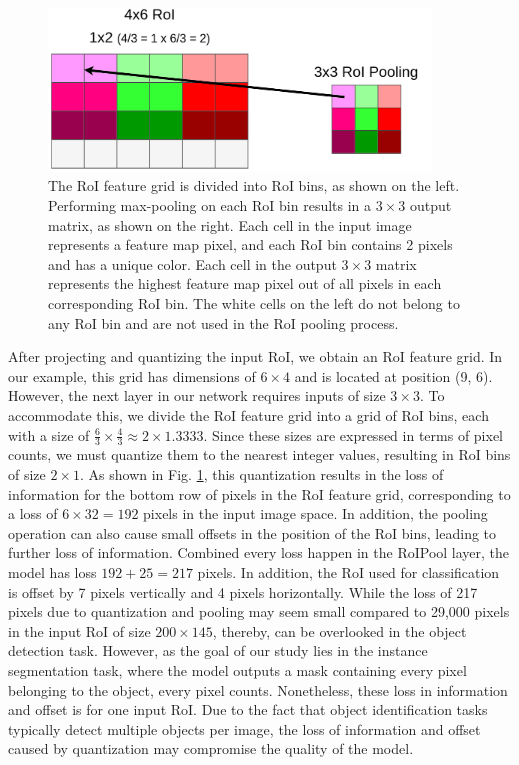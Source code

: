 \begin{figure}[!ht]
    \centering
    \includegraphics[width=4in]{figures/roi_pool_ex.png}
    \caption{The RoI feature grid is divided into RoI bins, as shown on the left. Performing max-pooling on each RoI bin results in a $3 \times 3$ output matrix, as shown on the right. Each cell in the input image represents a feature map pixel, and each RoI bin contains 2 pixels and has a unique color. Each cell in the output $3 \times 3$ matrix represents the highest feature map pixel out of all pixels in each corresponding RoI bin. The white cells on the left do not belong to any RoI bin and are not used in the RoI pooling process.\cite{roi_pooling_problem}}
    \label{fig:roi_pool_ex}
\end{figure}

After projecting and quantizing the input RoI, we obtain an RoI feature grid. In our example, this grid has dimensions of $6 \times 4$ and is located at position (9, 6). However, the next layer in our network requires inputs of size $3 \times 3$. To accommodate this, we divide the RoI feature grid into a grid of RoI bins, each with a size of $\frac{6}{3} \times \frac{4}{3} \approx 2 \times 1.3333$. Since these sizes are expressed in terms of pixel counts, we must quantize them to the nearest integer values, resulting in RoI bins of size $2 \times 1$. As shown in Fig. \ref{fig:roi_pool_ex}, this quantization results in the loss of information for the bottom row of pixels in the RoI feature grid, corresponding to a loss of $6 \times 32 = 192$ pixels in the input image space. In addition, the pooling operation can also cause small offsets in the position of the RoI bins, leading to further loss of information. Combined every loss happen in the RoIPool layer, the model has loss $192+25=217$ pixels. In addition, the RoI used for classification is offset by 7 pixels vertically and 4 pixels horizontally. While the loss of 217 pixels due to quantization and pooling may seem small compared to 29,000 pixels in the input RoI of size $200 \times 145$, thereby, can be overlooked in the object detection task. However, as the goal of our study lies in the instance segmentation task, where the model outputs a mask containing every pixel belonging to the object, every pixel counts. Nonetheless, these loss in information and offset is for one input RoI. Due to the fact that object identification tasks typically detect multiple objects per image, the loss of information and offset caused by quantization may compromise the quality of the model. 

